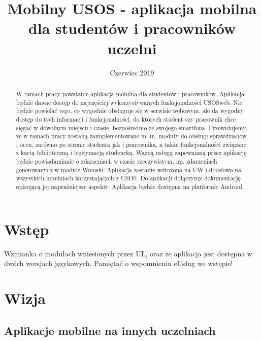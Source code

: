 \documentclass{pracamgr}
\title{Mobilny USOS - aplikacja mobilna dla studentów i pracowników uczelni}
\date{Czerwiec 2019}
\begin{document}
\maketitle
\begin{abstract}
  W ramach pracy powstanie aplikacja mobilna dla
  studentów i pracowników. Aplikacja będzie dawać dostęp do najczęściej wykorzystywanych 
  funkcjonalności USOSweb. Nie będzie powielać tego, co wygodnie obsługuje się w serwisie 
  webowym, ale da wygodny dostęp do tych informacji i funkcjonalności, do których student czy 
  pracownik chce sięgać w dowolnym miejscu i czasie, bezpośrednio ze swojego smartfona. 
  Przewidujemy, że w ramach pracy zostaną zaimplementowane m. in. moduły do obsługi 
  sprawdzianów i ocen, zarówno po stronie studenta jak i pracownika, a także funkcjonalności 
  związane z kartą biblioteczną i legitymacją studencką. Ważną usługą zapewnianą przez 
  aplikację będzie powiadamianie o zdarzeniach w czasie rzeczywistym, np. zdarzeniach 
  generowanych w module Wnioski. Aplikacja zostanie wdrożona na UW i docelowo na 
  wszystkich uczelniach korzystających z USOS. Do aplikacji dołączymy dokumentację opisującą 
  jej najważniejsze aspekty. Aplikacja będzie dostępna na platformie Android.
\end{abstract}

\tableofcontents

\setlength{\LTpost}{0pt} %

\chapter{Wstęp}

Wzmianka o modułach wniesionych przez UŁ, oraz że aplikacja jest dostępna
w dwóch wersjach językowych. Pamiętać o wspomnieniu eUsług we wstępie!


\chapter{Wizja}

\section{Aplikacje mobilne na innych uczelniach}
\end{document}
